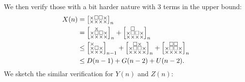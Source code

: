 \documentclass[a4paper,12pt]{article}
\makeatletter
\newenvironment{grid}
  {\begingroup\footnotesize
   \renewcommand{\arraystretch}{0}
   \setlength{\arraycolsep}{0pt}
   \left[\begin{array}{@{}*{10}{c}@{}}}
  {\end{array}\right]\endgroup}
\newcommand{\void}{\phantom{\times}}
\newcommand{\myD}{
    \begin{grid}
        \times & \void & \void \\
        \times & \square & \times \\
	\times & \times & \times
    \end{grid}
}
\newcommand{\myX}{
    \begin{grid}
        \times & \square & \square & \times \\
        \times & \times & \times & \times
    \end{grid}
}
\makeatother
\begin{document}
	We then verify those with a bit harder nature with $3$ terms in the upper bound:
	\begin{align*}
		X(n) &= \myX_n \\
		&= \begin{grid}
        \void & \times & \void & \void \\
        \times & \square & \square & \times \\
        \times & \times & \times & \times
    \end{grid}_n + \begin{grid}
        \void & \square & \void & \void \\
        \times & \square & \square & \times \\
        \times & \times & \times & \times
		\end{grid}_n \\
		&\le \myD_{n-1} + \begin{grid}
        \void & \square & \times & \void \\
        \times & \square & \square & \times \\
        \times & \times & \times & \times
		\end{grid}_n + \begin{grid}
        \void & \square & \square & \void \\
        \times & \square & \square & \times \\
        \times & \times & \times & \times
		\end{grid}_n \\
		&\le D(n-1) + G(n-2) + U(n-2).
	\end{align*}
	We sketch the similar verification for $Y(n)$ and $Z(n)$:
\end{document}
